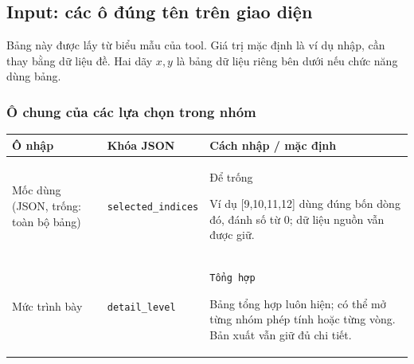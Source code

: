 \subsection*{Input: các ô đúng tên trên giao diện}
Bảng này được lấy từ biểu mẫu của tool. Giá trị mặc định là ví dụ nhập, cần thay bằng dữ liệu đề. Hai dãy $x,y$ là bảng dữ liệu riêng bên dưới nếu chức năng dùng bảng.
\subsubsection*{Ô chung của các lựa chọn trong nhóm}
\begin{center}\small\begin{tabular}{@{}p{.32\linewidth}p{.17\linewidth}p{.43\linewidth}@{}}\toprule
Ô nhập & Khóa JSON & Cách nhập / mặc định\\\midrule
Mốc dùng (JSON,\allowbreak{} trống: toàn bộ bảng) & \texttt{selected\_indices} & Để trống
\par Ví dụ [9,\allowbreak{}10,\allowbreak{}11,\allowbreak{}12] dùng đúng bốn dòng đó,\allowbreak{} đánh số từ 0;\allowbreak{} dữ liệu nguồn vẫn được giữ.\\[3pt]
Mức trình bày & \texttt{detail\_level} & \texttt{Tổng hợp}
\par Bảng tổng hợp luôn hiện;\allowbreak{} có thể mở từng nhóm phép tính hoặc từng vòng. Bản xuất vẫn giữ đủ chi tiết.\\[3pt]
\bottomrule\end{tabular}\end{center}
